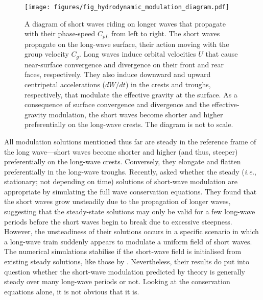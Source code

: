 \documentclass[lineno]{jfm}
\begin{document}
\begin{figure}
\centering
\texttt{[image: figures/fig\_hydrodynamic\_modulation\_diagram.pdf]}
\caption{
  A diagram of short waves riding on longer waves that propagate with their
  phase-speed $C_{pL}$ from left to right.
  The short waves propagate on the long-wave surface, their action
  moving with the group velocity $C_g$.
  Long waves induce orbital velocities $U$ that cause near-surface convergence
  and divergence on their front and rear faces, respectively.
  They also induce downward and upward centripetal accelerations
  ($dW/dt$) in the crests and troughs, respectively, that
  modulate the effective gravity at the surface.
  As a consequence of surface convergence and divergence and the effective-gravity
  modulation, the short waves become shorter and higher preferentially
  on the long-wave crests.
  The diagram is not to scale.
}
\label{fig:hydrodynamic_modulation_diagram}
\end{figure}

All modulation solutions mentioned thus far are steady in the reference frame
of the long wave---short waves become shorter and higher (and thus, steeper)
preferentially on the long-wave crests.
Conversely, they elongate and flatten preferentially in the long-wave troughs.
Recently, \citet{peureux2021unsteady} asked whether the steady
(\textit{i.e.}, stationary; not depending on time) solutions
of short-wave modulation are appropriate by simulating the full wave conservation
equations.
They found that the short waves grow unsteadily due to the propagation of
longer waves, suggesting that the steady-state solutions may only be valid for
a few long-wave periods before the short waves begin to break due to excessive
steepness.
However, the unsteadiness of their solutions occurs in a specific scenario in
which a long-wave train suddenly appears to modulate a uniform field of short
waves.
The numerical simulations stabilise if the short-wave field is initialised
from existing steady solutions, like those by \citet{longuet1960changes}.
Nevertheless, their results do put into question whether the short-wave
modulation predicted by theory is generally steady over many long-wave periods
or not.
Looking at the conservation equations alone, it is not obvious that it is.
\end{document}
